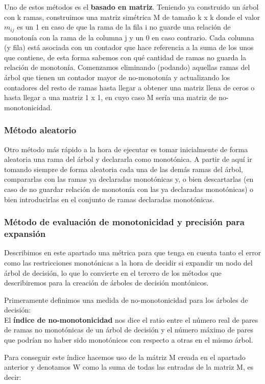 Uno de estos métodos es el \textbf{basado en matriz}. Teniendo ya construido un árbol con k ramas, construimos una matriz simétrica M de tamaño k x k donde el valor $m_{ij}$ es un 1 en caso de que la rama de la fila i no guarde una relación de monotonía con la rama de la columna j y un 0 en caso contrario. Cada columna (y fila) está asociada con un contador que hace referencia a la suma de los unos que contiene, de esta forma sabemos con qué cantidad de ramas no guarda la relación de monotonía. Comenzamos eliminando (podando) aquellas ramas del árbol que tienen un contador mayor de no-monotonía y actualizando los contadores del resto de ramas hasta llegar a obtener una matriz llena de ceros o hasta llegar a una matriz 1 x 1, en cuyo caso M sería una matriz de no-monotonicidad.

\subsubsection{Método aleatorio}

Otro método más rápido a la hora de ejecutar es tomar inicialmente de forma aleatoria una rama del árbol y declararla como monotónica. A partir de aquí ir tomando siempre de forma aleatoria cada una de las demás ramas del árbol, compararlas con las ramas ya declaradas monotónicas y, o bien descartarlas (en caso de no guardar relación de monotonía con las ya declaradas monotónicas) o bien introducirlas en el conjunto de ramas declaradas monotónicas.

\subsubsection{Método de evaluación de monotonicidad y precisión para expansión}

Describimos en este apartado una métrica para que tenga en cuenta tanto el error como las restricciones monotónicas a la hora de decidir si expandir un nodo del árbol de decisión, lo que lo convierte en el tercero de los métodos que describiremos para la creación de árboles de decisión montónicos\cite{ref14}.

Primeramente definimos una medida de no-monotonicidad para los árboles de decisión:\\
El \textbf{índice de no-monotonicidad} nos dice el ratio entre el número real de pares de ramas no monotónicas de un árbol de decisión y el número máximo de pares que podrían no haber sido monotónicos con respecto a otras en el mismo árbol.

Para conseguir este índice hacemos uso de la mátriz M creada en el apartado anterior y denotamos W como la suma de todas las entradas de la matriz M, es decir:

